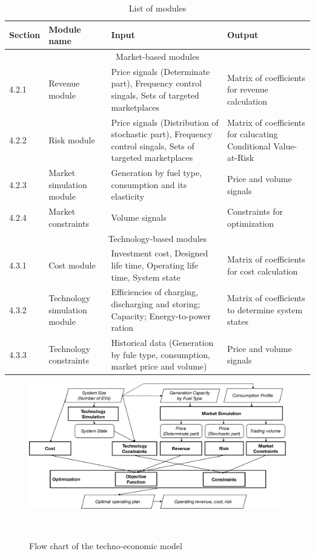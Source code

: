 \begin{table}
	\label{tb:modules}
	\begin{center}
		\begin{tabular}{|m{1.5cm}| m{2.75 cm} | m{4 cm} | m{4cm} |}
			\hline
			\textbf{Section} &\textbf{Module name} & \textbf{Input} & \textbf{Output} %
			\\[0.5ex]
			\hline \hline
			\multicolumn{4}{|c|}{Market-based modules }\\
			\hline
			4.2.1&Revenue module & Price signals (Determinate part), Frequency control singals, Sets of targeted marketplaces & Matrix of coefficients for revenue calculation %
			\\
			\hline
			4.2.2&Risk module & Price signals (Distribution of stochastic part), Frequency control singals, Sets of targeted marketplaces& Matrix of coefficients for calucating Conditional Value-at-Risk %
			\\
			\hline
			4.2.3&Market simulation module & Generation by fuel type, consumption and its elasticity& Price and volume signals%
			\\
			\hline
			4.2.4&Market constraints & Volume signals & Constraints for optimization %
			\\
			\hline
			\hline
			\multicolumn{4}{|c|}{Technology-based modules }\\
			\hline
			4.3.1&Cost module & Investment cost, Designed life time, Operating life time, System state & Matrix of coefficients for cost calculation %
			\\
			\hline
			4.3.2&Technology simulation module & Efficiencies of charging, discharging and storing; Capacity; Energy-to-power ration& Matrix of coefficients to determine system states %
			\\
			\hline
			4.3.3&Technology constraints & Historical data (Generation by fule type, consumption, market price and volume)& Price and volume signals %
			\\
			\hline
		\end{tabular}
	\end{center}
	\caption{List of modules}
\end{table}

\begin{figure}[h!]
	\label{fig:model-flow}
	\includegraphics[scale=0.4]{Figures/ModelFlow.pdf}
	\caption{Flow chart of the techno-economic model}\
\end{figure}

